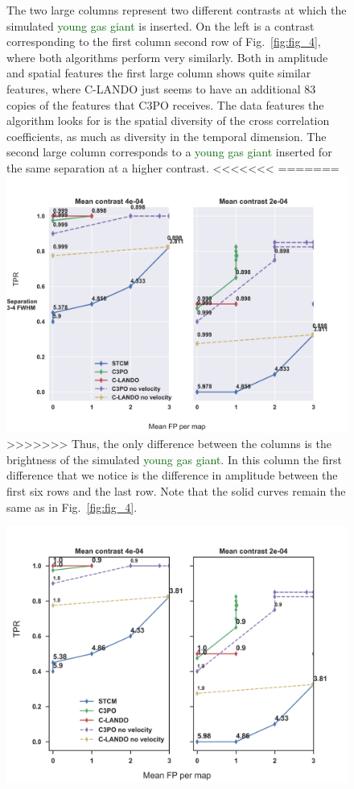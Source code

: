 \documentclass{aa}
\newcommand{\newchange}[1]{\textcolor{darkgreen}{#1}}
\begin{document}
{{{\begin{figure}[t]
{The two large columns represent two different contrasts at which the simulated \newchange{young gas giant} is inserted. On the left is a contrast corresponding to the first column second row of Fig.~\ref{fig:fig_4}, where both algorithms perform very similarly.
Both in amplitude and spatial features the first large column shows quite similar features, where C-LANDO just seems to have an additional $83$ copies of the features that C3PO receives. 
The data features the algorithm looks for is the spatial diversity of the cross correlation coefficients, as much as diversity in the temporal dimension.
The second large column corresponds to a \newchange{young gas giant} inserted for the same separation at a higher contrast.
<<<<<<<
=======
    \includegraphics[width=\textwidth]{Fig6_final_September.png}
>>>>>>>
Thus, the only difference between the columns is the brightness of the simulated \newchange{young gas giant}.
In this column the first difference that we notice is the difference in amplitude between the first six rows and the last row.
    Note that the solid curves remain the same as in Fig.~\ref{fig:fig_4}.
    }
\end{figure}
\begin{figure}
    \centering
    \includegraphics[width=\textwidth]{Fig6_April2024_referee_final.png}

\end{figure}}}}
\end{document}
